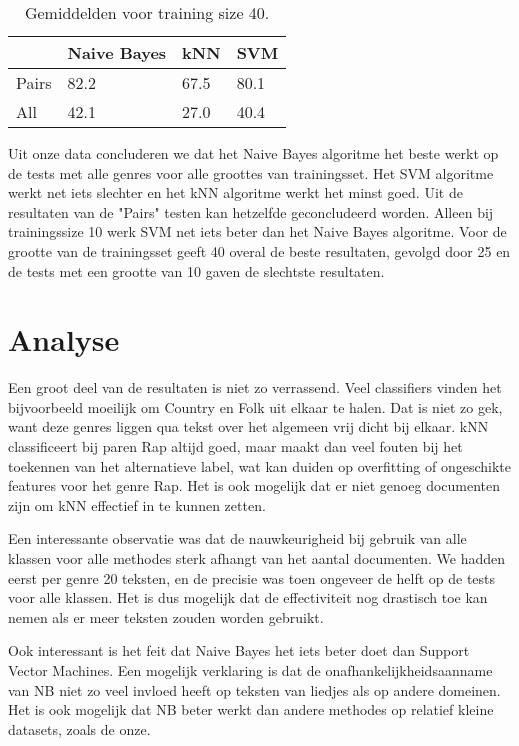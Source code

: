 \documentclass[a4paper,oneside]{article}
\begin{document}
\begin{table}[H]\centering
\caption{Gemiddelden voor training size 40.}
\begin{tabu}{l|l|l|l}
& Naive Bayes & kNN & SVM \\ \hline
Pairs & 82.2 & 67.5 & 80.1 \\
All & 42.1 & 27.0 & 40.4 \\
\end{tabu}
\end{table}

Uit onze data concluderen we dat het Naive Bayes algoritme het beste werkt op de tests met alle genres voor alle groottes van trainingsset. Het SVM algoritme werkt net iets slechter en het kNN algoritme werkt het minst goed. Uit de resultaten van de "Pairs" testen kan hetzelfde geconcludeerd worden. Alleen bij trainingssize 10 werk SVM net iets beter dan het Naive Bayes algoritme. Voor de grootte van de trainingsset geeft 40 overal de beste  resultaten, gevolgd door 25 en de tests met een grootte van 10 gaven de slechtste resultaten.

\section{Analyse}
Een groot deel van de resultaten is niet zo verrassend. Veel classifiers vinden het bijvoorbeeld moeilijk om Country en Folk uit elkaar te halen. Dat is niet zo gek, want deze genres liggen qua tekst over het algemeen vrij dicht bij elkaar. kNN classificeert bij paren Rap altijd goed, maar maakt dan veel fouten bij het toekennen van het alternatieve label, wat kan duiden op overfitting of ongeschikte features voor het genre Rap. Het is ook mogelijk dat er niet genoeg documenten zijn om kNN effectief in te kunnen zetten.

Een interessante observatie was dat de nauwkeurigheid bij gebruik van alle klassen voor alle methodes sterk afhangt van het aantal documenten. We hadden eerst per genre 20 teksten, en de precisie was toen ongeveer de helft op de tests voor alle klassen. Het is dus mogelijk dat de effectiviteit nog drastisch toe kan nemen als er meer teksten zouden worden gebruikt.

Ook interessant is het feit dat Naive Bayes het iets beter doet dan Support Vector Machines. Een mogelijk verklaring is dat de onafhankelijkheidsaanname van NB niet zo veel invloed heeft op teksten van liedjes als op andere domeinen. Het is ook mogelijk dat NB beter werkt dan andere methodes op relatief kleine datasets, zoals de onze.
\end{document}
